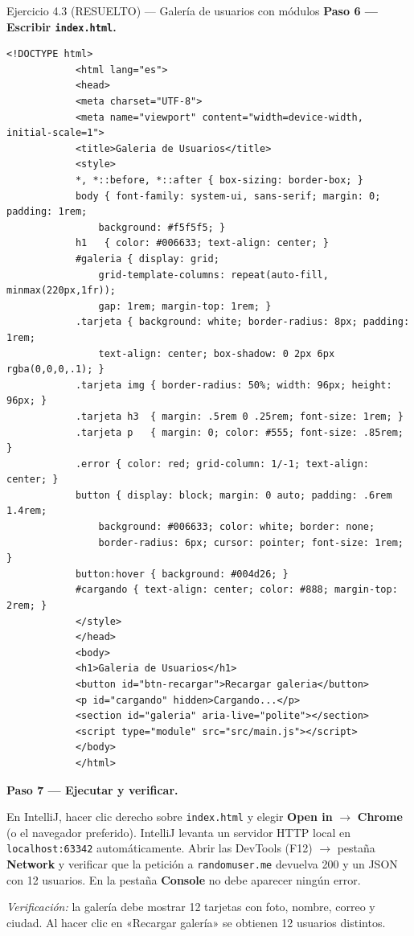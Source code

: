 \documentclass[11pt,a4paper,openany]{book}
\begin{document}
\begin{cajaejercicio}{Ejercicio 4.3 (RESUELTO) --- Galería de usuarios con módulos}
		\textbf{Paso 6 — Escribir \texttt{index.html}.}
		
		\begin{lstlisting}[style=html,numbers=none,caption={index.html},label=lst:4.ej3.html]
			<!DOCTYPE html>
			<html lang="es">
			<head>
			<meta charset="UTF-8">
			<meta name="viewport" content="width=device-width, initial-scale=1">
			<title>Galeria de Usuarios</title>
			<style>
			*, *::before, *::after { box-sizing: border-box; }
			body { font-family: system-ui, sans-serif; margin: 0; padding: 1rem;
				background: #f5f5f5; }
			h1   { color: #006633; text-align: center; }
			#galeria { display: grid;
				grid-template-columns: repeat(auto-fill, minmax(220px,1fr));
				gap: 1rem; margin-top: 1rem; }
			.tarjeta { background: white; border-radius: 8px; padding: 1rem;
				text-align: center; box-shadow: 0 2px 6px rgba(0,0,0,.1); }
			.tarjeta img { border-radius: 50%; width: 96px; height: 96px; }
			.tarjeta h3  { margin: .5rem 0 .25rem; font-size: 1rem; }
			.tarjeta p   { margin: 0; color: #555; font-size: .85rem; }
			.error { color: red; grid-column: 1/-1; text-align: center; }
			button { display: block; margin: 0 auto; padding: .6rem 1.4rem;
				background: #006633; color: white; border: none;
				border-radius: 6px; cursor: pointer; font-size: 1rem; }
			button:hover { background: #004d26; }
			#cargando { text-align: center; color: #888; margin-top: 2rem; }
			</style>
			</head>
			<body>
			<h1>Galeria de Usuarios</h1>
			<button id="btn-recargar">Recargar galeria</button>
			<p id="cargando" hidden>Cargando...</p>
			<section id="galeria" aria-live="polite"></section>
			<script type="module" src="src/main.js"></script>
			</body>
			</html>
		\end{lstlisting}
		
		\textbf{Paso 7 — Ejecutar y verificar.}
		
		En IntelliJ, hacer clic derecho sobre \texttt{index.html} y
		elegir \textbf{Open in} $\rightarrow$ \textbf{Chrome} (o el
		navegador preferido). IntelliJ levanta un servidor HTTP local
		en \texttt{localhost:63342} automáticamente. Abrir las DevTools
		(F12) $\rightarrow$ pestaña \textbf{Network} y verificar
		que la petición a \texttt{randomuser.me} devuelva 200 y un JSON
		con 12 usuarios. En la pestaña \textbf{Console} no debe aparecer
		ningún error.
		
		\emph{Verificación:} la galería debe mostrar 12 tarjetas con foto,
		nombre, correo y ciudad. Al hacer clic en «Recargar galería» se
		obtienen 12 usuarios distintos.
	\end{cajaejercicio}
	
\end{document}
